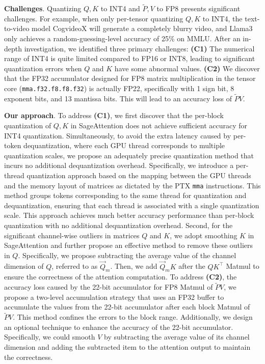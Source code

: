 \noindent\textbf{{Challenges}}. Quantizing $Q, K$ to INT4 and $\widetilde{P}, V$ to FP8 presents significant challenges. For example, when only per-tensor quantizing $Q, K$ to INT4, the text-to-video model CogvideoX will generate a completely blurry video, and Llama3 only achieves a random-guessing-level accuracy of 25\% on MMLU. After an in-depth investigation, we identified three primary challenges: \textbf{(C1)} The numerical range of INT4 is quite limited compared to FP16 or INT8, leading to significant quantization errors when $Q$ and $K$ have some abnormal values. 
\textbf{(C2)} We discover that the FP32 accumulator designed for FP8 matrix multiplication in the tensor core (\texttt{mma.f32.f8.f8.f32}) is actually FP22, specifically with 1 sign bit, 8 exponent bits, and 13 mantissa bits. This will lead to an accuracy loss of $\widetilde{P}V$. 

\noindent\textbf{{Our approach}}. 
To address \textbf{(C1)}, we first discover that the per-block quantization of $Q, K$ in SageAttention does not achieve sufficient accuracy for INT4 quantization. Simultaneously, to avoid the extra latency caused by per-token dequantization, where each GPU thread corresponds to multiple quantization scales, we propose an adequately precise quantization method that incurs no additional dequantization overhead. Specifically, we introduce a per-thread quantization approach based on the mapping between the GPU threads and the memory layout of matrices as dictated by the PTX \texttt{mma} instructions. This method groups tokens corresponding to the same thread for quantization and dequantization, ensuring that each thread is associated with a single quantization scale. This approach achieves much better accuracy performance than per-block quantization with no additional dequantization overhead.
Second, for the significant channel-wise outliers in matrices $Q$ and $K$, we adopt smoothing $K$ in SageAttention and further propose an effective method to remove these outliers in $Q$. Specifically, we propose subtracting the average value of the channel dimension of $Q$, referred to as $\overrightarrow Q_m$. Then, we add $\overrightarrow Q_mK$ after the $QK^\top$ Matmul to ensure the correctness of the attention computation.
To address \textbf{(C2)}, the accuracy loss caused by the 22-bit accumulator for FP8 Matmul of $\widetilde{P}V$, we propose a two-level accumulation strategy that uses an FP32 buffer to accumulate the values from the 22-bit accumulator after each block Matmul of $\widetilde{P}V$. This method confines the errors to the block range.
Additionally, we design an optional technique to enhance the accuracy of the 22-bit accumulator. Specifically, we could smooth $V$ by subtracting the average value of its channel dimension and adding the subtracted item to the attention output to maintain the correctness.


